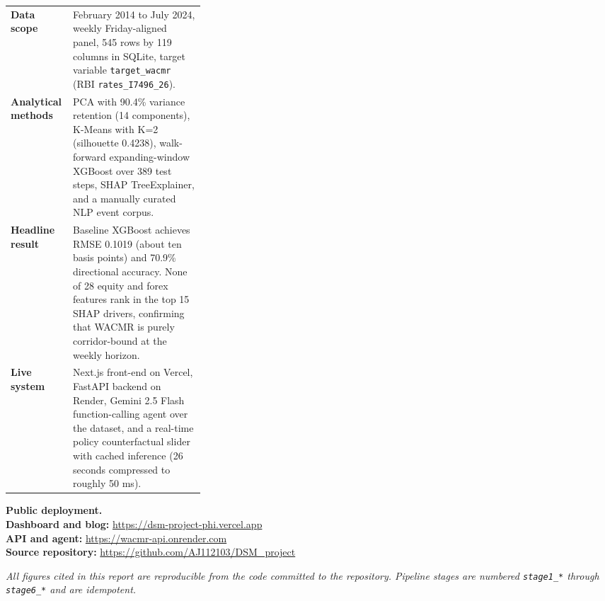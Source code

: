 \begin{titlepage}
\vspace{0.8em}
\noindent
\renewcommand{\arraystretch}{1.25}
\begin{tabularx}{\linewidth}{@{}p{0.32\linewidth} Y@{}}
\toprule
{}\textbf{\color{Slate}Data scope} &
February 2014 to July 2024, weekly Friday-aligned panel,
545 rows by 119 columns in SQLite, target variable
\texttt{target\_wacmr} (RBI \texttt{rates\_I7496\_26}). \\
\textbf{\color{Slate}Analytical methods} &
PCA with 90.4\% variance retention (14 components), K-Means with K=2 (silhouette 0.4238),
walk-forward expanding-window XGBoost over 389 test steps, SHAP
TreeExplainer, and a manually curated NLP event corpus. \\
\textbf{\color{Slate}Headline result} &
Baseline XGBoost achieves RMSE 0.1019 (about ten basis points) and 70.9\%
directional accuracy. None of 28 equity and forex features rank in the
top 15 SHAP drivers, confirming that WACMR is purely corridor-bound at
the weekly horizon. \\
\textbf{\color{Slate}Live system} &
Next.js front-end on Vercel, FastAPI backend on Render, Gemini 2.5 Flash
function-calling agent over the dataset, and a real-time policy
counterfactual slider with cached inference (26 seconds compressed to
roughly 50 ms). \\
\bottomrule
\end{tabularx}

\vspace{1.0em}
\noindent\textbf{\color{Slate}Public deployment.}\\[2pt]
\noindent\hspace{0.3em}\textbf{Dashboard and blog:} \url{https://dsm-project-phi.vercel.app}\\
\noindent\hspace{0.3em}\textbf{API and agent:} \url{https://wacmr-api.onrender.com}\\
\noindent\hspace{0.3em}\textbf{Source repository:} \url{https://github.com/AJ112103/DSM_project}

\vfill
\noindent\textit{\small \color{Slate} All figures cited in this report are reproducible from the
code committed to the repository. Pipeline stages are numbered
\texttt{stage1\_*} through \texttt{stage6\_*} and are idempotent.}
\end{titlepage}

\setcounter{page}{2}
\hypersetup{linkcolor=Slate}
{\color{Slate}\tableofcontents}
\hypersetup{linkcolor=Teal}
\clearpage

